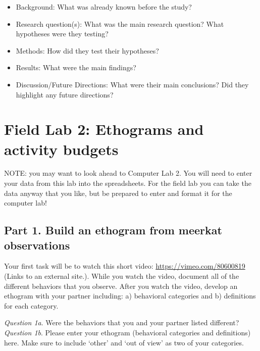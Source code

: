 \documentclass[]{book}
\providecommand{\tightlist}{%
  \setlength{\itemsep}{0pt}\setlength{\parskip}{0pt}}
\begin{document}
\begin{itemize}
\tightlist
\item
  Background: What was already known before the study?
\item
  Research question(s): What was the main research question? What hypotheses were they testing?
\item
  Methods: How did they test their hypotheses?
\item
  Results: What were the main findings?
\item
  Discussion/Future Directions: What were their main conclusions? Did they highlight any future directions?
\end{itemize}

\hypertarget{field-lab-2-ethograms-and-activity-budgets}{%
\chapter*{Field Lab 2: Ethograms and activity budgets}\label{field-lab-2-ethograms-and-activity-budgets}}

NOTE: you may want to look ahead to Computer Lab 2. You will need to enter your data from this lab into the spreadsheets. For the field lab you can take the data anyway that you like, but be prepared to enter and format it for the computer lab!

\hypertarget{part-1.-build-an-ethogram-from-meerkat-observations}{%
\section*{Part 1. Build an ethogram from meerkat observations}\label{part-1.-build-an-ethogram-from-meerkat-observations}}

Your first task will be to watch this short video: \url{https://vimeo.com/80600819} (Links to an external site.). While you watch the video, document all of the different behaviors that you observe. After you watch the video, develop an ethogram with your partner including: a) behavioral categories and b) definitions for each category.

\emph{Question 1a}. Were the behaviors that you and your partner listed different?
\emph{Question 1b}. Please enter your ethogram (behavioral categories and definitions) here. Make sure to include `other' and `out of view' as two of your categories.
\end{document}

